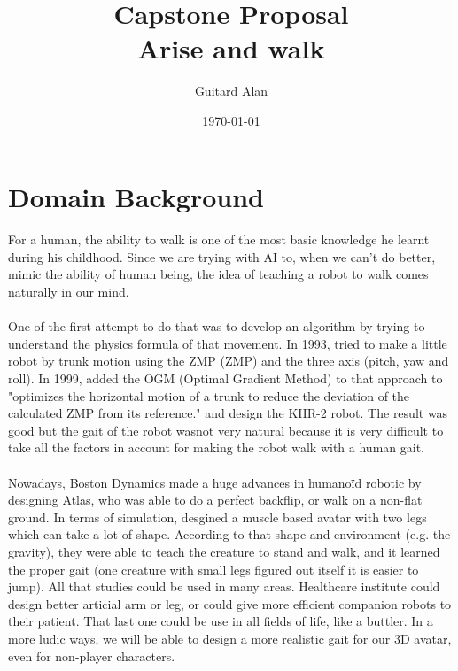 \documentclass{article}
\title{\textbf{Capstone Proposal}\\Arise and walk}
\date{\today}
\author{Guitard Alan}
\begin{document}
\raggedright
	\maketitle	
	\section{Domain Background}
  \paragraph{}
  For a human, the ability to walk is one of the most basic knowledge he learnt
  during his childhood. Since we are trying with AI to, when we can't do better,
  mimic the ability of human being, the idea of teaching a robot to walk comes
  naturally in our mind.
  \paragraph{}
  One of the first attempt to do that was to develop an algorithm by trying to
  understand the physics formula of that movement. In 1993,
  \citet{1993-TrunkMotion} tried to make a little robot by trunk motion
  using the ZMP (\gls{ZMP}) and the three
  axis (pitch, yaw and roll)\cite{1993-TrunkMotion}. In 1999, \citeauthor{1999-KHR-2}
  added the OGM (Optimal Gradient Method) to that approach
  to "optimizes the horizontal motion of a trunk to reduce the
  deviation of the calculated ZMP from its
  reference." \cite{1999-KHR-2} and design the KHR-2 robot.
  The result was good but the gait of the robot wasnot very natural because
  it is very difficult to take all the factors in account for making
  the robot walk with a human gait.
  \paragraph{}
  Nowadays, Boston Dynamics made a huge advances in humanoïd robotic by
  designing Atlas, who was able to do a perfect backflip, or walk on a non-flat
  ground. In terms of simulation, \citeauthor{2013-TOG-MuscleBasedBipeds}
  desgined a muscle based avatar with two legs which can take a lot of shape.
  According to that shape and environment (e.g. the gravity), they were able to
  teach the creature to stand and walk, and it learned the proper gait (one
  creature with small legs figured out itself it is easier to
  jump).\cite{2013-TOG-MuscleBasedBipeds}
  All that studies could be used in many areas. Healthcare institute could
  design better articial arm or leg, or could give more efficient companion
  robots to their patient. That last one could be use in all fields of life,
  like a buttler. In a more ludic ways, we will be able to design a more
  realistic gait for our 3D avatar, even for non-player characters. 
  
\end{document}

